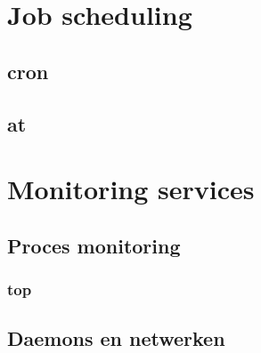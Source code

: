 \documentclass[a4paper,12pt,twoside,openright,titlepage]{book}
\begin{document}
\chapter{Job scheduling}

\section{cron}

\section{at}

\chapter{Monitoring services}

\section{Proces monitoring}

\subsection{top}

\section{Daemons en netwerken}


\printindex
\end{document}
